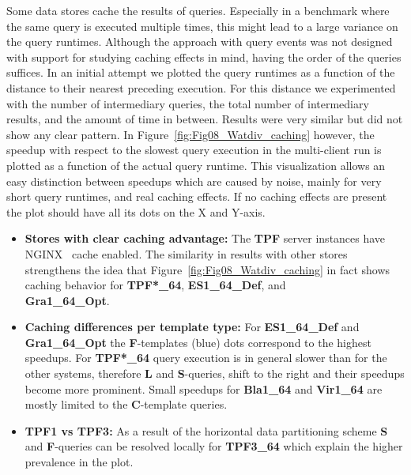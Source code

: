 %



Some data stores cache the results of queries. Especially in a benchmark where the same query is executed multiple times, this might lead to a large variance on the query runtimes. Although the approach with query events was not designed with support for studying caching effects in mind, having the order of the queries suffices. 
In an initial attempt we plotted the query runtimes as a function of the distance to their nearest preceding execution. For this distance we experimented with the number of intermediary queries, the total number of intermediary results, and the amount of time in between. Results were very similar but did not show any clear pattern. 
In Figure~\ref{fig:Fig08_Watdiv_caching} however, the speedup with respect to the slowest query execution in the multi-client run is plotted as a function of the actual query runtime. This visualization allows an easy distinction between speedups which are caused by noise, mainly for very short query runtimes, and real caching effects. If no caching effects are present the plot should have all its dots on the X and Y-axis.
\begin{itemize}
	\item \textbf{Stores with clear caching advantage:} The \textbf{TPF} server instances have NGINX~\cite{nginx} cache enabled. The similarity in results with other stores strengthens the idea that Figure~\ref{fig:Fig08_Watdiv_caching} in fact shows caching behavior for 
	\textbf{TPF*\_64}, \textbf{ES1\_64\_Def}, and \\ \textbf{Gra1\_64\_Opt}.
	
	\item \textbf{Caching differences per template type:} For \textbf{ES1\_64\_Def} and \textbf{Gra1\_64\_Opt} the \textbf{F}-templates (blue) dots correspond to the highest speedups. For \textbf{TPF*\_64} query execution is in general slower than for the other systems, therefore \textbf{L} and \textbf{S}-queries, shift to the right and their speedups become more prominent. Small speedups for \textbf{Bla1\_64} and \textbf{Vir1\_64} are mostly limited to the \textbf{C}-template queries.
	\item \textbf{TPF1 vs TPF3:} As a result of the horizontal data partitioning scheme \textbf{S} and \textbf{F}-queries can be resolved locally for \textbf{TPF3\_64} which explain the higher prevalence in the plot.
\end{itemize}






